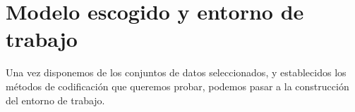 \chapter{Modelo escogido y entorno de trabajo}

Una vez disponemos de los conjuntos de datos seleccionados, y establecidos los métodos de codificación que queremos probar, podemos pasar a la construcción del entorno de trabajo.
